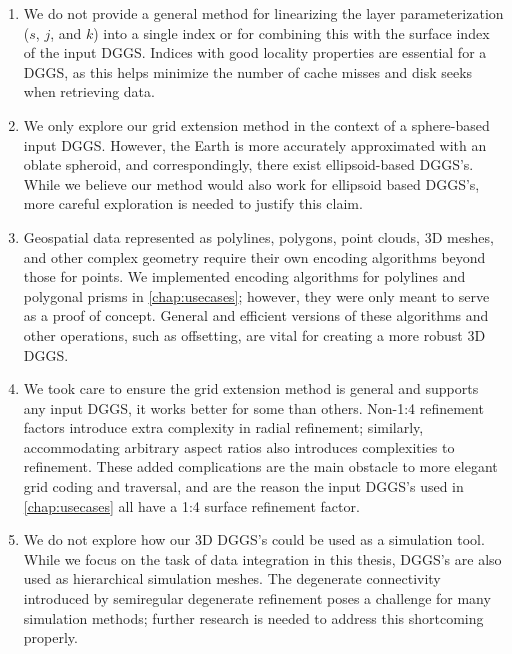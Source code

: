 \begin{enumerate}
	\item We do not provide a general method for linearizing the layer parameterization ($s$, $j$, and $k$) into a single index or for combining this with the surface index of the input DGGS.
	Indices with good locality properties are essential for a DGGS, as this helps minimize the number of cache misses and disk seeks when retrieving data.

	\item We only explore our grid extension method in the context of a sphere-based input DGGS.
	However, the Earth is more accurately approximated with an oblate spheroid, and correspondingly, there exist ellipsoid-based DGGS's.
	While we believe our method would also work for ellipsoid based DGGS's, more careful exploration is needed to justify this claim.

	\item Geospatial data represented as polylines, polygons, point clouds, 3D meshes, and other complex geometry require their own encoding algorithms beyond those for points.
	We implemented encoding algorithms for polylines and polygonal prisms in \cref{chap:usecases}; however, they were only meant to serve as a proof of concept.
	General and efficient versions of these algorithms and other operations, such as offsetting, are vital for creating a more robust 3D DGGS.

	\item We took care to ensure the grid extension method is general and supports any input DGGS, it works better for some than others.
	Non-1:4 refinement factors introduce extra complexity in radial refinement; similarly, accommodating arbitrary aspect ratios also introduces complexities to refinement.
	These added complications are the main obstacle to more elegant grid coding and traversal, and are the reason the input DGGS's used in \cref{chap:usecases} all have a 1:4 surface refinement factor.

	\item We do not explore how our 3D DGGS's could be used as a simulation tool.
	While we focus on the task of data integration in this thesis, DGGS's are also used as hierarchical simulation meshes.
	The degenerate connectivity introduced by semiregular degenerate refinement poses a challenge for many simulation methods; further research is needed to address this shortcoming properly.
\end{enumerate}


